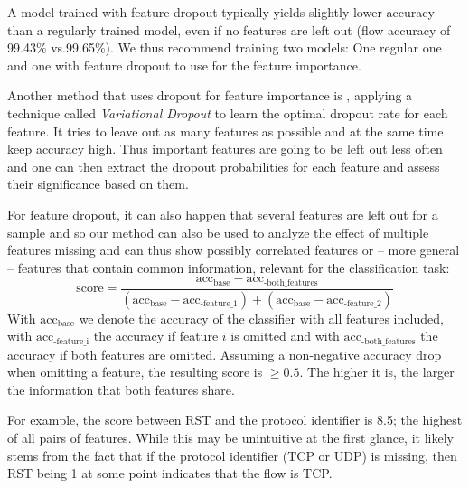 \documentclass[conference]{IEEEtran}
\begin{document}
A model trained with feature dropout typically yields slightly lower accuracy than a regularly trained model, even if no features are left out (flow accuracy of 99.43\% vs.99.65\%). We thus recommend training two models: One regular one and one with feature dropout to use for the feature importance.

Another method that uses dropout for feature importance is \cite{chang_dropout_2017}, applying a technique called \textit{Variational Dropout} to learn the optimal dropout rate for each feature. It tries to leave out as many features as possible and at the same time keep accuracy high. Thus important features are going to be left out less often and one can then extract the dropout probabilities for each feature and assess their significance based on them.

For feature dropout, it can also happen that several features are left out for a sample and so our method can also be used to analyze the effect of multiple features missing and can thus show possibly correlated features or -- more general -- features that contain common information, relevant for the classification task:
\begin{equation}
\text{score} = \frac{\text{acc}_{\text{base}}-\text{acc}_{\text{-both\_features}}}{\left(\text{acc}_{\text{base}}-\text{acc}_{\text{-feature\_1}}\right) + \left(\text{acc}_{\text{base}}-\text{acc}_{\text{-feature\_2}}\right)}
\end{equation}
With $\text{acc}_{\text{base}}$ we denote the accuracy of the classifier with all features included, with $\text{acc}_{\text{-feature\_i}}$ the accuracy if feature $i$ is omitted and with $\text{acc}_{\text{-both\_features}}$ the accuracy if both features are omitted. Assuming a non-negative accuracy drop when omitting a feature, the resulting score is $\ge 0.5$. The higher it is, the larger the information that both features share.

For example, the score between RST and the protocol identifier is 8.5; the highest of all pairs of features. While this may be unintuitive at the first glance, it likely stems from the fact that if the protocol identifier (TCP or UDP) is missing, then 
RST being 1 at some point indicates that the flow is TCP.
\end{document}

